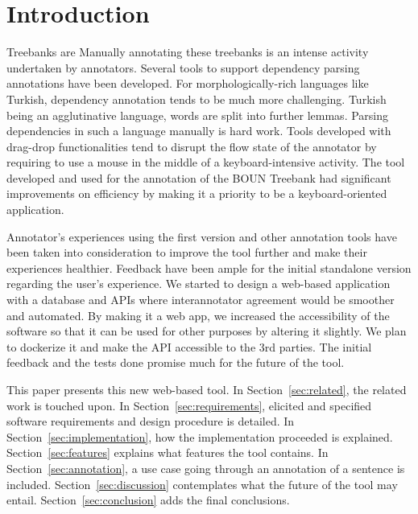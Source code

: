 \documentclass[
]{ceurart}
\begin{document}
\maketitle

\section{Introduction}
\label{sec:introduction}
Treebanks are 
Manually annotating these treebanks is an intense activity undertaken by annotators.
Several tools to support dependency parsing annotations have been developed. %
For morphologically-rich languages like Turkish, dependency annotation tends to be much more challenging.
Turkish being an agglutinative language, words are split into further lemmas.
Parsing dependencies in such a language manually is hard work.
Tools developed with drag-drop functionalities tend to disrupt the flow state of the annotator by requiring to use a mouse in the middle of a keyboard-intensive activity.
The tool developed and used for the annotation of the BOUN Treebank had significant improvements on efficiency by making it a priority to be a keyboard-oriented application.

Annotator's experiences using the first version and other annotation tools have been taken into consideration to improve the tool further and make their experiences healthier.
Feedback have been ample for the initial standalone version regarding the user's experience.
We started to design a web-based application with a database and APIs where interannotator agreement would be smoother and automated.
By making it a web app, we increased the accessibility of the software so that it can be used for other purposes by altering it slightly.
We plan to dockerize it and make the API accessible to the 3rd parties.
The initial feedback and the tests done promise much for the future of the tool.

This paper presents this new web-based tool.
In Section~\ref{sec:related}, the related work is touched upon.
In Section~\ref{sec:requirements}, elicited and specified software requirements and design procedure is detailed.
In Section~\ref{sec:implementation}, how the implementation proceeded is explained.
Section~\ref{sec:features} explains what features the tool contains.
In Section~\ref{sec:annotation}, a use case going through an annotation of a sentence is included.
Section~\ref{sec:discussion} contemplates what the future of the tool may entail.
Section~\ref{sec:conclusion} adds the final conclusions.
\end{document}
